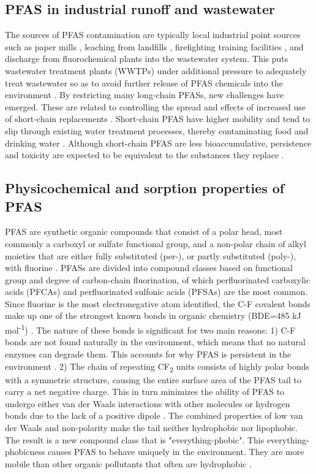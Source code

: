 \subsection{PFAS in industrial runoff and wastewater}
The sources of PFAS contamination are typically local industrial point sources such as paper mills \citep{lee2020legacy,langberg2021paper}, leaching from landfills \citep{masoner2020landfill}, firefighting training facilities \citep{filipovic2015historical}, and discharge from fluorochemical plants \citep{gebbink2017presence} into the wastewater system. This puts wastewater treatment plants (\acrshort{WWTPs}) under additional pressure to adequately treat wastewater so as to avoid further release of PFAS chemicals into the environment \citep{Morin2017flameWaste}. By restricting many long-chain PFASs, new challenges have emerged. These are related to controlling the spread and effects of increased use of short-chain replacements \citep{knutsen2019leachate}. Short-chain PFAS have higher mobility and tend to slip through existing water treatment processes, thereby contaminating food and drinking water \citep{hale2020persistent,brendel2018short}. Although short-chain PFAS are less bioaccumulative, persistence and toxicity are expected to be equivalent to the substances they replace \citep{EC2020PFAS}. 

\subsection{Physicochemical and sorption properties of PFAS}\label{sec:physchem} 
PFAS are synthetic organic compounds that consist of a polar head, most commonly a carboxyl or sulfate functional group, and a non-polar chain of alkyl moieties that are either fully substituted (per-), or partly substituted (poly-), with fluorine \citep{wang2011physchem}. PFASs are divided into compound classes based on functional group and degree of carbon-chain fluorination, of which perfluorinated carboxylic acids (\acrshort{PFCA}s) and perfluorinated sulfonic acids (PFSAs) are the most common. Since fluorine is the most electronegative atom identified, the C-F covalent bonds make up one of the strongest known bonds in organic chemistry (BDE=485 kJ mol\textsuperscript{-1}) \citep{Lau2007}. The nature of these bonds is significant for two main reasons: 1) C-F bonds are not found naturally in the environment, which means that no natural enzymes can degrade them. This accounts for why PFAS is persistent in the environment \citep{hale2020persistent,krafft2015per}. 2) The chain of repeating CF\textsubscript{2} units consists of highly polar bonds with a symmetric structure, causing the entire surface area of the PFAS tail to carry a net negative charge. This in turn minimizes the ability of PFAS to undergo either van der Waals interactions with other molecules or hydrogen bonds due to the lack of a positive dipole \citep{Arp2006}. The combined properties of low van der Waals and non-polarity make the tail neither hydrophobic nor lipophobic. The result is a new compound class that is "everything-phobic". This everything-phobicness causes \acrshort{PFAS} to behave uniquely in the environment. They are more mobile than other organic pollutants that often are hydrophobic \citep{hale2020persistent}. 

